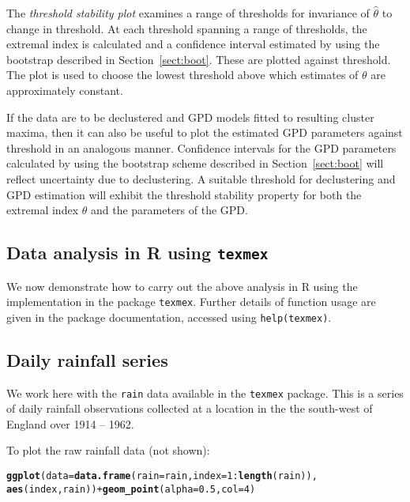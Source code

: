 \documentclass[10pt]{article}\usepackage[]{graphicx}\usepackage[]{color}
\makeatletter
\newcommand{\hlnum}[1]{\textcolor[rgb]{0.686,0.059,0.569}{#1}}%
\newcommand{\hlopt}[1]{\textcolor[rgb]{0,0,0}{#1}}%
\newcommand{\hlstd}[1]{\textcolor[rgb]{0.345,0.345,0.345}{#1}}%
\newcommand{\hlkwc}[1]{\textcolor[rgb]{0.333,0.667,0.333}{#1}}%
\newcommand{\hlkwd}[1]{\textcolor[rgb]{0.737,0.353,0.396}{\textbf{#1}}}%
\newenvironment{kframe}{%
 \def\at@end@of@kframe{}%
 \ifinner\ifhmode%
  \def\at@end@of@kframe{\end{minipage}}%
  \begin{minipage}{\columnwidth}%
 \fi\fi%
 \def\FrameCommand##1{\hskip\@totalleftmargin \hskip-\fboxsep
 \colorbox{shadecolor}{##1}\hskip-\fboxsep
     \hskip-\linewidth \hskip-\@totalleftmargin \hskip\columnwidth}%
 \MakeFramed {\advance\hsize-\width
   \@totalleftmargin\z@ \linewidth\hsize
   \@setminipage}}%
 {\par\unskip\endMakeFramed%
 \at@end@of@kframe}
\newenvironment{knitrout}{}{} %
\makeatother
\begin{document}
The {\it threshold stability plot} examines a range of thresholds for invariance of $\hat\theta$ to change in threshold.  At each threshold spanning a range of thresholds, the extremal index is calculated and a confidence interval estimated by using the bootstrap described in Section~\ref{sect:boot}.  These are plotted against threshold.  The plot is used to choose the lowest threshold above which estimates of $\theta$ are approximately constant.

If the data are to be declustered and GPD models fitted to resulting cluster maxima, then it can also be useful to plot the estimated GPD parameters against threshold in an analogous manner.  Confidence intervals for the GPD parameters calculated by using the bootstrap scheme described in Section~\ref{sect:boot} will reflect uncertainty due to declustering. A suitable threshold for declustering and GPD estimation will exhibit the threshold stability property for both the extremal index $\theta$ and the parameters of the GPD.
%
\subsection{Data analysis in R using {\tt texmex}}
\label{sect:dataAnalysis}
%
We now demonstrate how to carry out the above analysis in R using the implementation in the package {\tt texmex}.  Further details of function usage are given in the package documentation, accessed using {\tt help(texmex)}.
%
\subsection{Daily rainfall series}
%
We work here with the {\tt rain} data available in the {\tt texmex} package.  This is a series of daily rainfall observations collected at a location in the the south-west of England over 1914 -- 1962.


To plot the raw rainfall  data (not shown):
\begin{knitrout}
\color{fgcolor}\begin{kframe}
\begin{alltt}
\hlkwd{ggplot}\hlstd{(}\hlkwc{data}\hlstd{=}\hlkwd{data.frame}\hlstd{(}\hlkwc{rain}\hlstd{=rain,}\hlkwc{index}\hlstd{=}\hlnum{1}\hlopt{:}\hlkwd{length}\hlstd{(rain)),}
       \hlkwd{aes}\hlstd{(index,rain))} \hlopt{+} \hlkwd{geom_point}\hlstd{(}\hlkwc{alpha}\hlstd{=}\hlnum{0.5}\hlstd{,}\hlkwc{col}\hlstd{=}\hlnum{4}\hlstd{)}
\end{alltt}
\end{kframe}
\end{knitrout}
\end{document}
